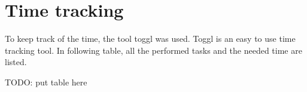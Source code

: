 \section{Time tracking}
    \label{sec:Time tracking}

To keep track of the time, the tool toggl was used. Toggl is an easy to use time tracking tool. In following table, all the performed tasks and the needed time are listed.



TODO: put table here


